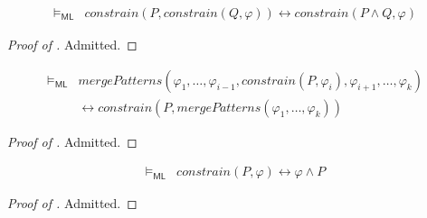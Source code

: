 \documentclass{article}
\newcommand{\ML}{\mathsf{ML}}
\begin{document}
\begin{lemma}\label{lem:doubleconstrain}
    \begin{align*}
        \vDash_\ML & \mathit{constrain}(P , \mathit{constrain}(Q, \varphi))
        \leftrightarrow \mathit{constrain}(P \land Q, \varphi)
    \end{align*}
\end{lemma}
\begin{proof}[Proof of ]
Admitted.
\end{proof}

\begin{lemma}\label{lem:constrainMergeComm}
    \begin{align*}
        \vDash_\ML & \mathit{mergePatterns}(\varphi_1, \ldots, \varphi_{i-1}, \mathit{constrain}(P, \varphi_i), \varphi_{i+1}, \ldots, \varphi_k) \\
        & \leftrightarrow \mathit{constrain}(P, \mathit{mergePatterns(\varphi_1, \ldots, \varphi_k)})
    \end{align*}
\end{lemma}
\begin{proof}[Proof of ]
Admitted.
\end{proof}

\begin{lemma}\label{lem:constrainAsConjunction}
    \begin{align*}
        \vDash_{\ML} & \mathit{constrain}(P, \varphi) \leftrightarrow \varphi \land P
    \end{align*}
\end{lemma}
\begin{proof}[Proof of ]
Admitted.
\end{proof}
\end{document}
